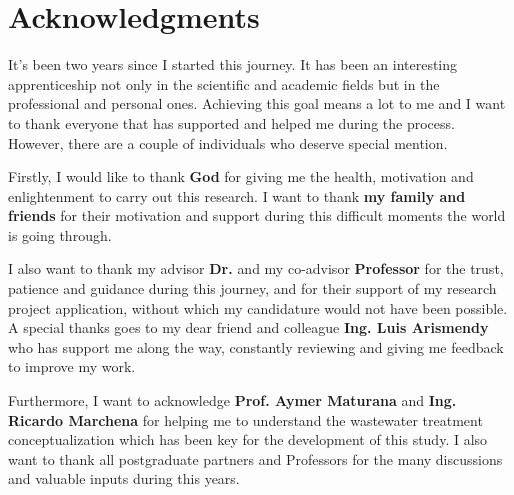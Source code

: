 \chapter*{Acknowledgments}

It’s been two years since I started this journey. It has been an interesting apprenticeship not only in the scientific and academic fields but in the professional and personal ones. Achieving this goal means a lot to me and I want to thank everyone that has supported and helped me during the process. However, there are a couple of individuals who deserve special mention.

Firstly, I would like to thank \textbf{God} for giving me the health, motivation and enlightenment to carry out this research. I want to thank \textbf{my family and friends} for their motivation and support during this difficult moments the world is going through.

I also want to thank my advisor \textbf{Dr.} \textbf{\myProfFirstName} \textbf{\myProfLastName} and my co-advisor \textbf{Professor} \textbf{\myOtherProfFirstName} \textbf{\myOtherProfLastName} for the trust, patience and guidance during this journey, and for their support of my research project application, without which my candidature would not have been possible. A special thanks goes to my dear friend and colleague \textbf{Ing. Luis Arismendy} who has support me along the way, constantly reviewing and giving me feedback to improve my work.

Furthermore, I want to acknowledge \textbf{Prof. Aymer Maturana} and \textbf{Ing. Ricardo Marchena} for helping me to understand the wastewater treatment conceptualization which has been key for the development of this study. I also want to thank all postgraduate partners and Professors for the many discussions and valuable inputs during this years. 




